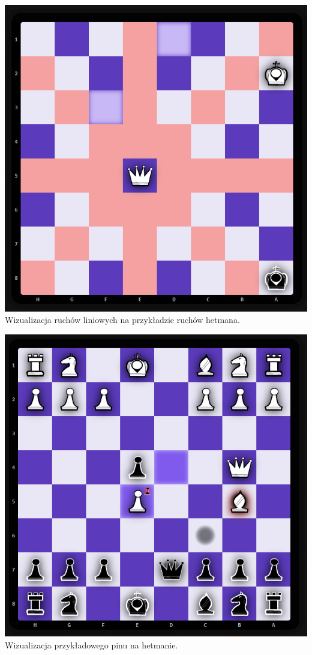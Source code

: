 \documentclass[12pt,a4paper]{article}
\begin{document}
\vspace{1cm}
\begin{minipage}[t]{0.45\textwidth} 
    \vspace{0pt} 
    \centering 
    \includegraphics[width=\linewidth]{images/imp_front_linear.png} 
    Wizualizacja ruchów liniowych na przykładzie ruchów hetmana.
\end{minipage} 
\hfill 
\begin{minipage}[t]{0.45\textwidth} 
    \vspace{0pt} 
    \centering 
    \includegraphics[width=\linewidth]{images/imp_front_pin.png} 
    Wizualizacja przykładowego pinu na hetmanie.
\end{minipage}
\vspace{1cm}
\end{document}
